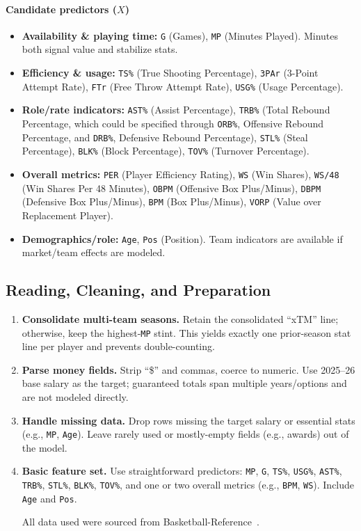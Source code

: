 \documentclass{article}
\theoremstyle{plain}
\theoremstyle{definition}
\theoremstyle{remark}
\begin{document}
\paragraph{Candidate predictors (\(X\))}
\begin{itemize}
    \item \textbf{Availability \& playing time:} \texttt{G} (Games), \texttt{MP} (Minutes Played). Minutes both signal value and stabilize stats.
    \item \textbf{Efficiency \& usage:} \texttt{TS\%} (True Shooting Percentage), \texttt{3PAr} (3-Point Attempt Rate), \texttt{FTr} (Free Throw Attempt Rate), \texttt{USG\%} (Usage Percentage).
    \item \textbf{Role/rate indicators:} \texttt{AST\%} (Assist Percentage), \texttt{TRB\%} (Total Rebound Percentage, which could be specified through \texttt{ORB\%}, Offensive Rebound Percentage, and \texttt{DRB\%}, Defensive Rebound Percentage), \texttt{STL\%} (Steal Percentage), \texttt{BLK\%} (Block Percentage), \texttt{TOV\%} (Turnover Percentage).
    \item \textbf{Overall metrics:} \texttt{PER} (Player Efficiency Rating), \texttt{WS} (Win Shares), \texttt{WS/48} (Win Shares Per 48 Minutes), \texttt{OBPM} (Offensive Box Plus/Minus), \texttt{DBPM} (Defensive Box Plus/Minus), \texttt{BPM} (Box Plus/Minus), \texttt{VORP} (Value over Replacement Player).
    \item \textbf{Demographics/role:} \texttt{Age}, \texttt{Pos} (Position). Team indicators are available if market/team effects are modeled.
\end{itemize}

\subsection*{Reading, Cleaning, and Preparation}
\begin{enumerate}
    \item \textbf{Consolidate multi-team seasons.} Retain the consolidated ``xTM'' line; otherwise, keep the highest-\texttt{MP} stint. This yields exactly one prior-season stat line per player and prevents double-counting.
    \item \textbf{Parse money fields.} Strip ``\$'' and commas, coerce to numeric. Use 2025--26 base salary as the target; guaranteed totals span multiple years/options and are not modeled directly.
    \item \textbf{Handle missing data.} Drop rows missing the target salary or essential stats (e.g., \texttt{MP}, \texttt{Age}). Leave rarely used or mostly-empty fields (e.g., awards) out of the model.
    \item \textbf{Basic feature set.} Use straightforward predictors: \texttt{MP}, \texttt{G}, \texttt{TS\%}, \texttt{USG\%}, \texttt{AST\%}, \texttt{TRB\%}, \texttt{STL\%}, \texttt{BLK\%}, \texttt{TOV\%}, and one or two overall metrics (e.g., \texttt{BPM}, \texttt{WS}). Include \texttt{Age} and \texttt{Pos}.

All data used were sourced from Basketball-Reference~\cite{bbref_contracts,bbref_advanced_stats_2025}.

\end{enumerate}
\end{document}
